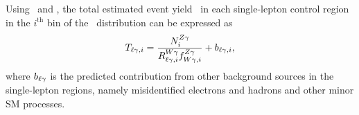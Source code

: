 Using \RWl\ and \fZW, the total estimated event yield \Tl\ in each single-lepton control region in the $i^\mathrm{th}$ bin of the \ETg\ distribution can be expressed as
\begin{equation}
  \Tl[,i] = \frac{\NZg[i]}{\RWl[,i]\fZW[,i]} + b_{\ell\Pgg,i},
\end{equation}
where $b_{\ell\Pgg}$ is the predicted contribution from other background sources in the single-lepton regions, namely misidentified electrons and hadrons and other minor SM processes.
